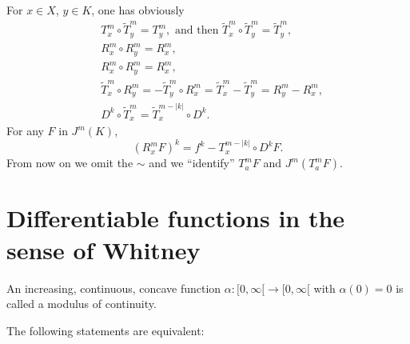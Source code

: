 For $x\in X$, $y\in K$, one has obviously
\begin{align}
& T^{m}_{x}\circ \widetilde{T}^{m}_{y}=T^{m}_{y},\text{ and then } \widetilde{T}^{m}_{x}\circ \widetilde{T}^{m}_{y}=\widetilde{T}^{m}_{y},\label{chap1-eq1.1}\\
& R^{m}_{x}\circ R^{m}_{y}=R^{m}_{x},\label{chap1-eq1.2}\\
& R^{m}_{x}\circ R^{m}_{y}=R^{m}_{x},\label{chap1-eq1.3}\\
& \widetilde{T}^{m}_{x}\circ R^{m}_{y}=-\widetilde{T}^{m}_{y}\circ R^{m}_{x}=\widetilde{T}^{m}_{x}-\widetilde{T}^{m}_{y}=R^{m}_{y}-R^{m}_{x},\label{chap1-eq1.4}\\
& D^{k}\circ \widetilde{T}^{m}_{x}=\widetilde{T}^{m-|k|}_{x}\circ D^{k}.\label{chap1-eq1.5}
\end{align}
For any $F$ in $J^{m}(K)$,
\begin{equation}
(R^{m}_{x}F)^{k}=f^{k}-T^{m-|k|}_{x}\circ D^{k}F.\label{chap1-eq1.6}
\end{equation}
From now on we omit the $\sim$ and we ``identify'' $T^{m}_{a}F$ and $J^{m}(T^{m}_{a}F)$.

\section{Differentiable functions in the sense of Whitney}\label{chap1-sec2}

\begin{definition}\label{chap1-defi2.1}
An increasing, continuous, concave function $\alpha:[0,\infty[\to [0,\infty[$ with $\alpha(0)=0$ is called a modulus of continuity.
\end{definition}

\begin{thm}\label{chap1-thm2.2}
The following statements are equivalent:
\end{thm}

\subsubsection{}%

